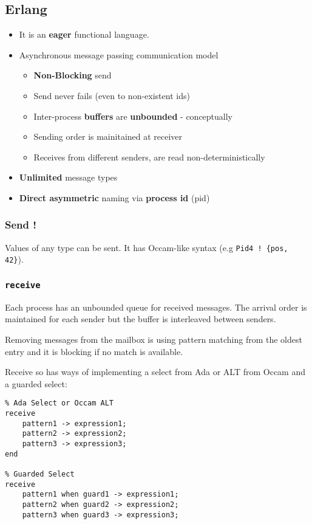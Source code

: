 \documentclass{article}
\begin{document}
\subsection{Erlang}
\label{sec:org9d62641}
\begin{itemize}
\item It is an \textbf{eager} functional language.
\item Asynchronous message passing communication model
\begin{itemize}
\item \textbf{Non-Blocking} send
\item Send never fails (even to non-existent ids)
\item Inter-process \textbf{buffers} are \textbf{unbounded} - conceptually
\item Sending order is mainitained at receiver
\item Receives from different senders, are read non-deterministically
\end{itemize}
\item \textbf{Unlimited} message types
\item \textbf{Direct asymmetric} naming via \textbf{process id} (pid)
\end{itemize}

\subsubsection{Send !}
\label{sec:org0d31047}
Values of any type can be sent.
It has Occam-like syntax (e.g \texttt{Pid4 ! \{pos, 42\}}).

\subsubsection{\texttt{receive}}
\label{sec:org5114c17}
Each process has an unbounded queue for received messages.
The arrival order is maintained for each sender but the buffer is interleaved between senders.

Removing messages from the mailbox is using pattern matching from the oldest entry and it is blocking if no match is available.

Receive so has ways of implementing a select from Ada or ALT from Occam and a guarded select:
\begin{verbatim}
% Ada Select or Occam ALT
receive
    pattern1 -> expression1;
    pattern2 -> expression2;
    pattern3 -> expression3;
end

% Guarded Select
receive
    pattern1 when guard1 -> expression1;
    pattern2 when guard2 -> expression2;
    pattern3 when guard3 -> expression3;
\end{verbatim}
\end{document}
